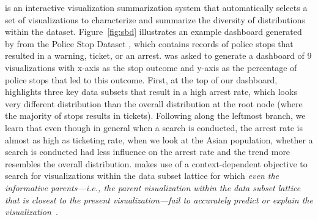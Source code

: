 \par \sbd is an interactive visualization 
summarization system that automatically 
selects a set of visualizations 
to characterize and summarize 
the diversity of distributions within the dataset. 
Figure~\ref{fig:sbd} illustrates 
an example dashboard generated by \sbd 
from the Police Stop Dataset \cite{police}, 
which contains records of police stops 
that resulted in a warning, ticket, or an arrest. 
\sbd was asked to generate 
a dashboard of 9 visualizations 
with x-axis as the stop outcome
and y-axis as the percentage of police stops that led to this outcome. 
First, at the top of our dashboard, 
\sbd highlights three key data subsets 
that result in a high arrest rate, 
which looks very different distribution
than the overall distribution at the root node 
(where the majority of stops results in tickets). 
Following along the leftmost branch, we learn that even though in general when a search is conducted, the arrest rate is 
almost as high as ticketing rate, 
when we look at the Asian population, 
whether a search is conducted had less influence 
on the arrest rate and the trend more resembles the overall distribution. 
\sbd makes use of a context-dependent objective 
to search for visualizations within 
the data subset lattice
for which \emph{even the informative parents---i.e., the parent visualization
within the data subset lattice that is closest to the present visualization---fail to accurately predict or explain the visualization}~\cite{Lee2018}. 

